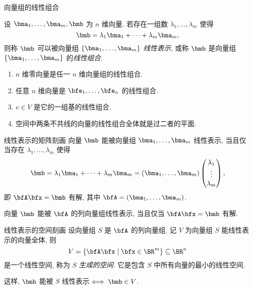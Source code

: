 \begin{frame}{向量组的线性组合}
	\onslide<+->
	\begin{definition}
		设 $\bma_1,\dots,\bma_m,\bmb$ 为 $n$ 维向量.
		若存在一组数 $\lambda_1,\dots,\lambda_m$ 使得
		\[\bmb=\lambda_1\bma_1+\cdots+\lambda_m\bma_m,\]
		则称 $\bmb$ 可以被向量组 $\{\bma_1,\dots,\bma_m\}$ \emph{线性表示}, 或称 $\bmb$ 是向量组 $\{\bma_1,\dots,\bma_m\}$ 的\emph{线性组合}.
	\end{definition}
	\onslide<+->
	\begin{example}
		\begin{enumerate}
			\item $n$ 维零向量是任一 $n$ 维向量组的线性组合.
			\item 任意 $n$ 维向量是 $\bfe_1,\dots,\bfe_n$ 的线性组合.
			\item $v\in V$ 是它的一组基的线性组合.
			\item 空间中两条不共线的向量的线性组合全体就是过二者的平面.
		\end{enumerate}
	\end{example}
\end{frame}


\begin{frame}{线性表示的矩阵刻画}
	\onslide<+->
	向量 $\bmb$ 能被向量组 $\bma_1,\dots,\bma_m$ 线性表示, 当且仅当存在 $\lambda_1,\dots,\lambda_m$ 使得
	\[\bmb=\lambda_1\bma_1+\cdots+\lambda_m\bma_m=(\bma_1,\dots,\bma_m)\begin{pmatrix}
		\lambda_1\\\vdots\\\lambda_m
	\end{pmatrix},\]
	\onslide<+->
	即 $\bfA\bfx=\bmb$ 有解, 其中 $\bfA=(\bma_1,\dots,\bma_m)$.
	\onslide<+->
	\begin{theorem}
		向量 $\bmb$ 能被 $\bfA$ 的列向量组线性表示, 当且仅当 $\bfA\bfx=\bmb$ 有解.
	\end{theorem}
\end{frame}


\begin{frame}{线性表示的空间刻画}
	\onslide<+->
	设向量组 $S$ 是 $\bfA$ 的列向量组.
	\onslide<+->
	记 $V$ 为向量组 $S$ 能线性表示的向量全体,
	\onslide<+->
	则
	\[V=\{\bfA\bfx\mid \bfx\in\BR^m\}\subseteq \BR^n\]
	是一个线性空间, 称为 $S$ \emph{生成的空间}.
	\onslide<+->
	它是包含 $S$ 中所有向量的最小的线性空间.

	\onslide<+->
	这样, $\bmb$ 能被 $S$ 线性表示$\iff \bmb\in V$.
\end{frame}


